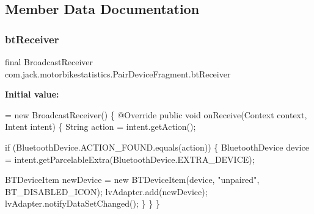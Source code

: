 \subsection{Member Data Documentation}
\mbox{\label{classcom_1_1jack_1_1motorbikestatistics_1_1_pair_device_fragment_a73a8c234c66657d94a4382925aa91517}} 
\subsubsection{\texorpdfstring{bt\+Receiver}{btReceiver}}
{\footnotesize\ttfamily final Broadcast\+Receiver com.\+jack.\+motorbikestatistics.\+Pair\+Device\+Fragment.\+bt\+Receiver}

{\bfseries Initial value\+:}
\begin{DoxyCode}
= \textcolor{keyword}{new} BroadcastReceiver() \{
        @Override
        \textcolor{keyword}{public} \textcolor{keywordtype}{void} onReceive(Context context, Intent intent) \{
            String action = intent.getAction();

            
            \textcolor{keywordflow}{if} (BluetoothDevice.ACTION\_FOUND.equals(action))
            \{
                BluetoothDevice device = intent.getParcelableExtra(BluetoothDevice.EXTRA\_DEVICE);

                
                BTDeviceItem newDevice = \textcolor{keyword}{new} BTDeviceItem(device, \textcolor{stringliteral}{"unpaired"}, BT\_DISABLED\_ICON);
                lvAdapter.add(newDevice);
                lvAdapter.notifyDataSetChanged();
            \}
        \}
    \}
\end{DoxyCode}
\mbox{\label{classcom_1_1jack_1_1motorbikestatistics_1_1_pair_device_fragment_ad61a96414649df9171ae051c3a2d4487}} 
